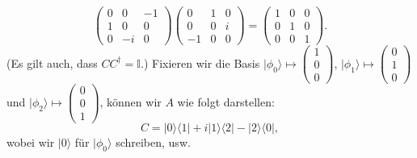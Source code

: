 \begin{beispiel}
\begin{equation}
\begin{pmatrix}
			0 & 0 & -1 \\
			1 & 0 & 0 \\
			0 & -i & 0
		\end{pmatrix}\begin{pmatrix}
			0 & 1 & 0 \\
			0 & 0 & i \\
			-1 & 0 & 0
		\end{pmatrix}
		= 
		\begin{pmatrix}
			1 & 0 & 0 \\
			0 & 1 & 0 \\
			0 & 0 & 1
		\end{pmatrix}.
	\end{equation}
	(Es gilt auch, dass $CC^\dag = \mathbb{I}$.)
	Fixieren wir die Basis $|\phi_0\rangle \mapsto \left(\begin{smallmatrix}
			1 \\ 0 \\ 0
		\end{smallmatrix}\right)$, $|\phi_1\rangle \mapsto \left(\begin{smallmatrix}
			0 \\ 1 \\ 0
		\end{smallmatrix}\right)$ und $|\phi_2\rangle \mapsto \left(\begin{smallmatrix}
			0 \\ 0 \\ 1
		\end{smallmatrix}\right)$, können wir $A$ wie folgt darstellen:
		\begin{equation}
			C = |0\rangle\langle 1| + i|1\rangle\langle 2| - |2\rangle\langle 0|,
		\end{equation}
		wobei wir $|0\rangle$ für $|\phi_0\rangle$ schreiben, usw.
\end{beispiel}